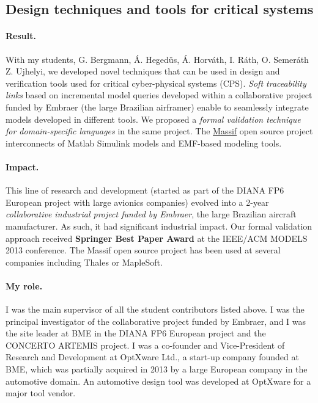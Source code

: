 \subsection{Design techniques and tools for critical systems}

\paragraph{Result.} 
With my students, G. Bergmann, Á. Hegedüs, Á. Horváth, I. Ráth, O. Semeráth Z. Ujhelyi, we developed novel techniques that can be used in design and verification tools used for critical cyber-physical systems (CPS). \emph{Soft traceability links} \cite{models2012,sosym2016-trace} based on incremental model queries developed within a collaborative project funded by Embraer (the large Brazilian airframer) enable to seamlessly integrate models developed in different tools. We proposed a \emph{formal validation technique for domain-specific languages} \cite{models2013,sosym2017-dsl} in the same project. The \href{https://github.com/viatra/massif/}{Massif} open source project interconnects of Matlab Simulink models and EMF-based modeling tools. 

\paragraph{Impact.} 
This line of research and development (started as part of the DIANA FP6 European project with large avionics companies) evolved into a 2-year \emph{collaborative industrial project funded by Embraer}, the large Brazilian aircraft manufacturer. As such, it had significant industrial impact. Our formal validation approach \cite{models2013} received \textbf{Springer Best Paper Award} at the IEEE/ACM MODELS 2013 conference. The Massif open source project has been used at several companies including Thales or MapleSoft.

\paragraph{My role.} 
I was the main supervisor of all the student contributors listed above. I was the principal investigator of the collaborative project funded by Embraer, and I was the site leader at BME in the DIANA FP6 European project and the CONCERTO ARTEMIS project. I was a co-founder and Vice-President of Research and Development at OptXware Ltd., a start-up company founded at BME, which was partially acquired in 2013 by a large European company in the automotive domain. An automotive design tool was developed at OptXware for a major tool vendor.


